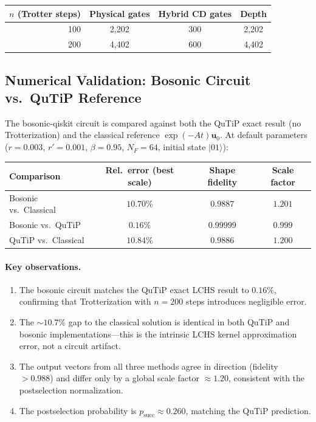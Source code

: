 \documentclass[11pt]{article}
\begin{document}
\begin{center}
\begin{tabular}{rccc}
  \toprule
  $n$ (Trotter steps) & Physical gates & Hybrid CD gates & Depth \\
  \midrule
  100 & 2{,}202 & 300 & 2{,}202 \\
  200 & 4{,}402 & 600 & 4{,}402 \\
  \bottomrule
\end{tabular}
\end{center}

\subsection{Numerical Validation: Bosonic Circuit vs.\ QuTiP Reference}

The bosonic-qiskit circuit is compared against both the QuTiP exact result
(no Trotterization) and the classical reference $\exp(-At)\mathbf{u}_0$.
At default parameters ($r=0.003$, $r'=0.001$, $\beta=0.95$, $N_F=64$,
initial state $|01\rangle$):

\begin{center}
\begin{tabular}{lccc}
  \toprule
  Comparison & Rel.\ error (best scale) & Shape fidelity & Scale factor \\
  \midrule
  Bosonic vs.\ Classical & $10.70\%$ & $0.9887$ & $1.201$ \\
  Bosonic vs.\ QuTiP & $\mathbf{0.16\%}$ & $\mathbf{0.99999}$ & $0.999$ \\
  QuTiP vs.\ Classical & $10.84\%$ & $0.9886$ & $1.200$ \\
  \bottomrule
\end{tabular}
\end{center}

\paragraph{Key observations.}
\begin{enumerate}[itemsep=2pt]
  \item The bosonic circuit matches the QuTiP exact LCHS result to $0.16\%$,
        confirming that Trotterization with $n=200$ steps introduces negligible error.
  \item The $\sim\!10.7\%$ gap to the classical solution is identical in both
        QuTiP and bosonic implementations---this is the intrinsic LCHS kernel
        approximation error, not a circuit artifact.
  \item The output vectors from all three methods agree in direction
        (fidelity $> 0.988$) and differ only by a global scale factor
        $\approx 1.20$, consistent with the postselection normalization.
  \item The postselection probability is $p_{\mathrm{succ}} \approx 0.260$,
        matching the QuTiP prediction.
\end{enumerate}
\end{document}
